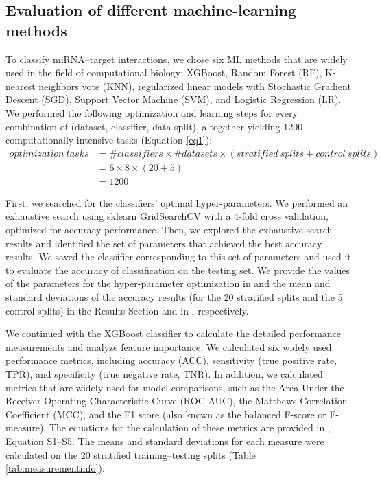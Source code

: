 \documentclass{bmcart}
\begin{document}
\subsection*{Evaluation of different machine-learning methods} \label{method_ml_methods}
To classify miRNA--target interactions, we chose six ML methods that are widely used in the field of computational biology: XGBoost\cite{xgboost}, Random Forest (RF), K-nearest neighbors vote (KNN), regularized linear models with Stochastic Gradient Descent (SGD), Support Vector Machine (SVM), and Logistic Regression (LR).
We performed the following optimization and learning steps for every combination of (dataset, classifier, data split), altogether yielding 1200 computationally intensive tasks (Equation \ref{eq1}):
\begin{equation} \label{eq1}
\begin{split}
optimization \: tasks & = \#classifiers \times \#datasets \times \left (stratified\: splits + control\: splits \right ) \\
 & = 6 \times8 \times( 20 + 5 ) \\
 & = 1200
\end{split}
\end{equation}

First, we searched for the classifiers' optimal hyper-parameters. We performed an exhaustive search using sklearn GridSearchCV with a 4-fold cross validation, optimized for accuracy performance. Then, we explored the exhaustive search results and identified the set of parameters that achieved the best accuracy results. We saved the classifier corresponding to this set of parameters and used it to evaluate the accuracy of classification on the testing set. We provide the values of the parameters for the hyper-parameter optimization in  and the  mean and standard deviations of the accuracy results (for the 20 stratified splits and the 5 control splits) in the Results Section and in , respectively.

We continued with the XGBoost classifier to calculate the detailed performance measurements and analyze feature importance. We calculated six widely used performance metrics, including accuracy (ACC), sensitivity (true positive rate, TPR), and specificity (true negative rate, TNR). In addition, we calculated metrics that are widely used for model comparisons, such as the Area Under the Receiver Operating Characteristic Curve (ROC AUC), the Matthews Correlation Coefficient (MCC), and the F1 score (also known as the balanced F-score or F-measure). The equations for the calculation of these metrics are provided in , Equation S1--S5.
The means and standard deviations for each measure were calculated on the 20 stratified training--testing splits (Table \ref{tab:measurementinfo}).
\end{document}

